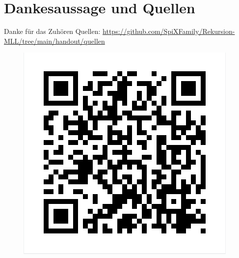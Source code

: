\documentclass{beamer}
\begin{document}
\section*{Dankesaussage und Quellen}
\begin{frame}{Danke für das Zuhören}
Quellen: \url{https://github.com/SpiXFamily/Rekursion-MLL/tree/main/handout/quellen}
\centering
\begin{figure}[H]
    \newline
    \includegraphics[width=0.5 \textwidth]{bilder/github-qr.png}
\end{figure}
\end{frame}
\end{document}
